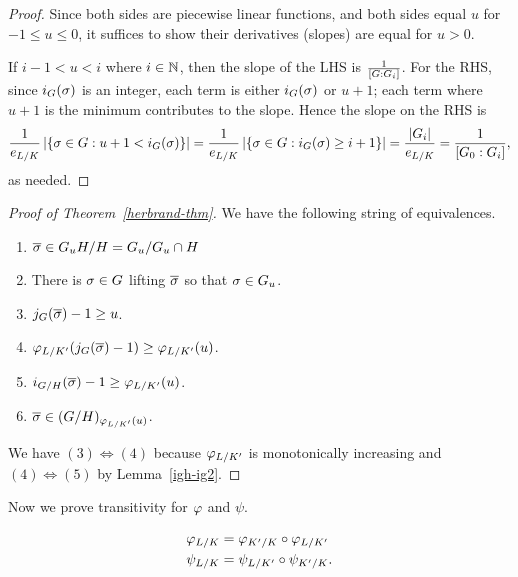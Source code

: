 \begin{proof}
Since both sides are piecewise linear functions, and both sides equal $u$ for $-1\le u\le 0$, it suffices to show their derivatives (slopes) are equal for $u>0$.

If $i-1<u<i$ where $i\in \mathbb{N}$, then the slope of the LHS is $\frac{1}{[G:G_i]}$. For the RHS, since $i_G(\sigma)$ is an integer, each term is either $i_G(\sigma)$ or $u+1$; each term where $u+1$ is the minimum contributes to the slope. Hence the slope on the RHS is 
\[
\frac{1}{e_{L/K}}\left| {
\left\{{\sigma\in G}:{u+1<i_G(\sigma)}\right\}
} \right|=\frac{1}{e_{L/K}}\left| {
\left\{{\sigma\in G}:{i_G(\sigma)\ge i+1}\right\}
} \right|=\frac{|G_i|}{e_{L/K}}=\frac{1}{[G_0:G_i]},
\]
as needed.
\end{proof}
\begin{proof}[Proof of Theorem~\ref{herbrand-thm}]
We have the following string of equivalences.
\begin{enumerate}
\item $\overline{\sigma}\in G_uH/H=G_u/G_u\cap H$
\item There is $\sigma\in G$ lifting $\overline{\sigma}$ so that $\sigma\in G_u$.
\item $j_G(\overline{\sigma})-1\ge u$.
\item $\varphi_{L/K'}(j_G(\overline{\sigma})-1)\ge\varphi_{L/K'}(u)$.
\item $i_{G/H}(\overline{\sigma})-1\ge\varphi_{L/K'}(u)$.
\item $\overline{\sigma} \in (G/H)_{\varphi_{L/K'}(u)}$.
\end{enumerate}
We have $(3)\iff(4)$ because $\varphi_{L/K'}$ is monotonically increasing and $(4)\iff (5)$ by Lemma~\ref{igh-ig2}.
\end{proof}
Now we prove transitivity for $\varphi$ and $\psi$. 
\begin{pr}
\begin{align*}
\varphi_{L/K}&=\varphi_{K'/K}\circ \varphi_{L/K'}\\
\psi_{L/K}&=\psi_{L/K'}\circ \psi_{K'/K}.
\end{align*}
\end{pr}
